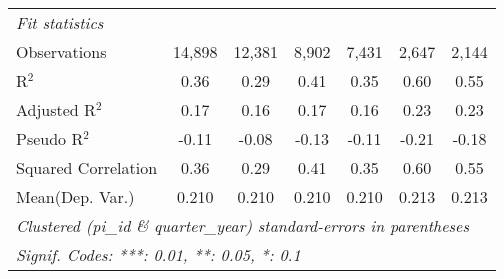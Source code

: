 \begin{tabular}{lcccccc}
   \midrule
   \emph{Fit statistics}\\
   Observations                                               & 14,898       & 12,381       & 8,902        & 7,431        & 2,647   & 2,144\\  
   R$^2$                                                      & 0.36         & 0.29         & 0.41         & 0.35         & 0.60    & 0.55\\  
   Adjusted R$^2$                                             & 0.17         & 0.16         & 0.17         & 0.16         & 0.23    & 0.23\\  
   Pseudo R$^2$                                               & -0.11        & -0.08        & -0.13        & -0.11        & -0.21   & -0.18\\  
   Squared Correlation                                        & 0.36         & 0.29         & 0.41         & 0.35         & 0.60    & 0.55\\  
Mean(Dep. Var.) & 0.210 & 0.210 & 0.210 & 0.210 & 0.213 & 0.213 \\
   \midrule \midrule
   \multicolumn{7}{l}{\emph{Clustered (pi\_id \& quarter\_year) standard-errors in parentheses}}\\
   \multicolumn{7}{l}{\emph{Signif. Codes: ***: 0.01, **: 0.05, *: 0.1}}\\
\end{tabular}
\par\endgroup
